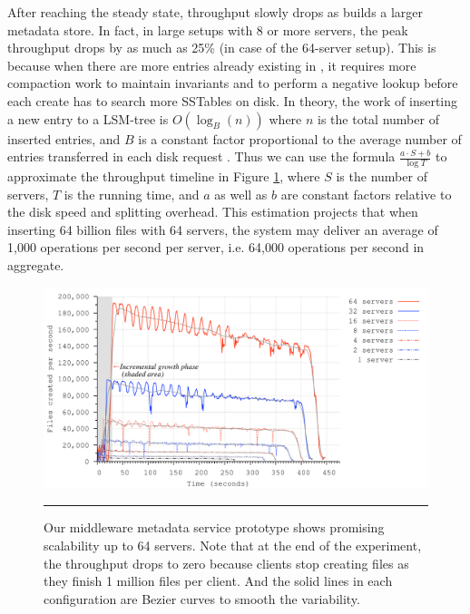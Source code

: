 After reaching the steady state, throughput slowly drops as \ldb builds a
larger metadata store.
In fact, in large setups with 8 or more servers, 
the peak throughput drops by as much as 25\% (in case of the 64-server setup).
This is because when there are more entries already existing in \ldb, 
it requires more compaction work to maintain \ldb invariants and to perform a 
negative lookup before each create has to search more SSTables on disk. 
In theory, the work of inserting a new entry to a LSM-tree is $O(\log_{B}(n))$
where $n$ is the total number of inserted entries, and $B$ is a constant factor
proportional to the average number of entries transferred in each disk request
\cite{Bender2007}.
Thus we can use the formula $\frac{a\cdot S+b}{\log{T}}$ to
approximate the throughput timeline in Figure \ref{graph:ldb-scaling},
where $S$ is the number of servers, $T$ is the running time, and $a$ as well as $b$ 
are constant factors relative to the disk speed and splitting overhead.
This estimation projects that when inserting 64 billion files with 64 servers,
the system may deliver an average of 1,000 operations per second per server,
i.e. 64,000 operations per second in aggregate.

\begin{figure}[t]  %
\centerline{\includegraphics[scale=0.33]{./figs/ldb_insertrate}}
\caption{\normalsize
Our middleware metadata service prototype shows promising scalability
up to 64 servers.
Note that at the end of the experiment, 
the throughput drops to zero 
because clients stop creating files as they finish 1 million files per client.
And the solid lines in each configuration are Bezier
curves to smooth the variability.
}
\vspace{10pt}
\hrule 
\label{graph:ldb-scaling}
\end{figure}       %

